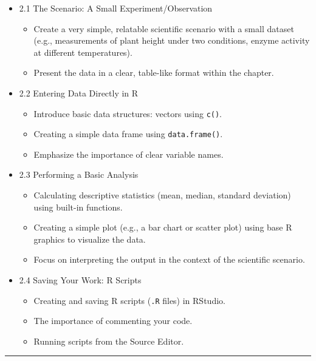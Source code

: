 \documentclass[
  letterpaper,
  DIV=11,
  numbers=noendperiod]{scrreprt}
\providecommand{\tightlist}{%
  \setlength{\itemsep}{0pt}\setlength{\parskip}{0pt}}\usepackage{longtable,booktabs,array}
\begin{document}
\begin{itemize}
\tightlist
\item
  2.1 The Scenario: A Small Experiment/Observation

  \begin{itemize}
  \tightlist
  \item
    Create a very simple, relatable scientific scenario with a small
    dataset (e.g., measurements of plant height under two conditions,
    enzyme activity at different temperatures).
  \item
    Present the data in a clear, table-like format within the chapter.
  \end{itemize}
\item
  2.2 Entering Data Directly in R

  \begin{itemize}
  \tightlist
  \item
    Introduce basic data structures: vectors using \texttt{c()}.
  \item
    Creating a simple data frame using \texttt{data.frame()}.
  \item
    Emphasize the importance of clear variable names.
  \end{itemize}
\item
  2.3 Performing a Basic Analysis

  \begin{itemize}
  \tightlist
  \item
    Calculating descriptive statistics (mean, median, standard
    deviation) using built-in functions.
  \item
    Creating a simple plot (e.g., a bar chart or scatter plot) using
    base R graphics to visualize the data.
  \item
    Focus on interpreting the output in the context of the scientific
    scenario.
  \end{itemize}
\item
  2.4 Saving Your Work: R Scripts

  \begin{itemize}
  \tightlist
  \item
    Creating and saving R scripts (\texttt{.R} files) in RStudio.
  \item
    The importance of commenting your code.
  \item
    Running scripts from the Source Editor.
  \end{itemize}
\end{itemize}

\begin{center}\rule{0.5\linewidth}{0.5pt}\end{center}
\end{document}
